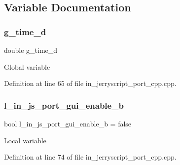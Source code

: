\subsection{Variable Documentation}
\mbox{\label{group___port_ga11e8aedc05744a3edca22a50f6fb1899}} 
\subsubsection{g\_time\_d}
{\footnotesize\ttfamily double g\+\_\+time\+\_\+d}

Global variable 

Definition at line 65 of file in\+\_\+jerryscript\+\_\+port\+\_\+cpp.\+cpp.

\mbox{\label{group___port_gad52187b22dd0de50cb3dfe7dae1a4e4d}} 
\subsubsection{l\_in\_js\_port\_gui\_enable\_b}
{\footnotesize\ttfamily bool l\+\_\+in\+\_\+js\+\_\+port\+\_\+gui\+\_\+enable\+\_\+b = false}

Local variable 

Definition at line 74 of file in\+\_\+jerryscript\+\_\+port\+\_\+cpp.\+cpp.


